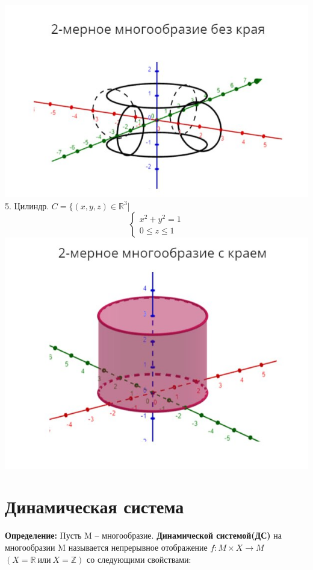 \documentclass[12pt,a4paper]{article}
\begin{document}
\includegraphics[scale=0.5]{image4.jpg}\\

5. Цилиндр.
\newline \(C = \{(x,y,z)\in \mathbb{R}^3\)|
\begin{equation*}
\begin{cases}
x^2+y^2=1
\\
0\leq z\leq1 
\end{cases}
\end{equation*}
\includegraphics[scale=0.5]{image5.jpg}
\newpage

\section*{Динамическая система}

\textbf{\large{Определение:}} Пусть M -- многообразие. \textbf{Динамической системой(ДС)} 
на многообразии M называется непрерывное отображение $f:M\times X \rightarrow M~$ $(X = \mathbb{R}~ \textit{или}~ X = \mathbb{Z})$ со следующими свойствами:
\end{document}

